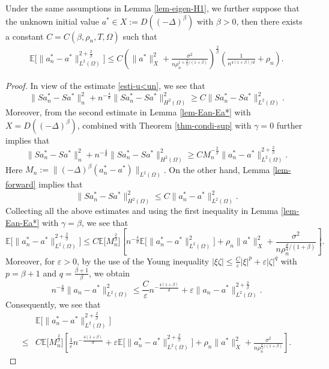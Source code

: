 \documentclass[10pt,a4paper]{amsart}
\begin{document}
\begin{theorem}\label{thm-E-condi}
Under the same assumptions in Lemma \ref{lem-eigen-H1}, we further suppose that the unknown initial value $a^*\in X:=D((-\Delta)^\beta)$ with $\beta>0$, then there exists a constant $C=C(\beta,\rho_n,T,\Omega)$ such that
\[
\begin{aligned}
\mathbb{E} \bigl[ \| a_n^* - a^* \|^{2+\frac{2}{\beta}}_{L^2(\Omega)} \bigr]
\le  C\left( \| a^* \|^2_{X} + \frac{\sigma^2}{n \rho_n^{1 + \frac{d}4/(1+\beta)}}\right)^{\frac2\beta} \left( \frac1{n^{4(1+\beta)/d}} +\rho_n \right).
\end{aligned}
\]
\end{theorem}

\begin{proof}
In view of the estimate \eqref{esti-u<un}, we see that
\[
 \| S a_n^* - S a^* \|^2_n  + n^{-\frac4d}  \| S a_n^* - S a^* \|^2_{H^2(\Omega)}  \geq C  \| S a_n^* - S a^* \|^2_{L^2(\Omega)}.
\]
Moreover, from the second estimate in Lemma \ref{lem-Ean-Ea*} with $X=D((-\Delta)^{\beta})$, combined with Theorem \ref{thm-condi-sup} with $\gamma=0$ further implies that
\[
 \| S a_n^* - S a^* \|^2_n  + n^{-\frac4d} \| S a_n^* - S a^* \|^2_{H^2(\Omega)}  \geq C  M_n^{-\frac{2}{\beta}}\| a_n^* - a^* \|^{2+\frac{2}{\beta}}_{L^2(\Omega)} .
\]
Here $M_n:= \|(-\Delta)^\beta (a_n^* - a^*)\|_{L^2(\Omega)}$. On the other hand, Lemma \ref{lem-forward} implies that
\[
 \| S a_n^* - S a^* \|^2_{H^2(\Omega)} \leq C \|a_n^* - a^* \|^2_{L^2(\Omega)} .
\]
Collecting all the above estimates and using the first inequality in Lemma \ref{lem-Ean-Ea*} with $\gamma=\beta$, we see that
\[
\mathbb{E} \bigl[ \| a_n^* - a^* \|^{2+\frac{2}{\beta}}_{L^2(\Omega)} \bigr]\le C\mathbb{E} \bigl[M_n^{\frac2\beta} \bigr] \left[n^{-\frac4d}\mathbb{E} \bigl[\|a_n^* - a^* \|^2_{L^2(\Omega)} \bigr] +  \rho_n \| a^* \|^2_{X} +  \frac{\sigma^2}{n \rho_n^{\frac{d}{4}/(1+\beta)}} \right].
\]
Moreover, for $\varepsilon>0$, by the use of the Young inequality $|\xi\zeta| \le \frac{C}{\varepsilon} |\xi|^p + \varepsilon |\zeta|^q$ with $p=\beta+1$ and $q=\frac{\beta+1}{\beta}$, we obtain
\[
 n^{-\frac4d}\|a_n - a^* \|^2_{L^2(\Omega)}  \le \frac{C}{\varepsilon}n^{-\frac{4(1+\beta)}d} + \varepsilon \|a_n - a^* \|^{2+\frac2\beta}_{L^2(\Omega)}.
\]
Consequently, we see that
\[
\begin{aligned}
&\mathbb{E} \bigl[ \| a_n^* - a^* \|^{2+\frac{2}{\beta}}_{L^2(\Omega)} \bigr] \\
\le&  C\mathbb{E} \bigl[M_n^{\frac2\beta} \bigr] \left[ \frac{1}{\varepsilon}n^{-\frac{4(1+\beta)}d}  + \varepsilon \mathbb{E} \bigl[\|a_n^* - a^* \|^{2+\frac2\beta}_{L^2(\Omega)} \bigr] +  \rho_n \| a^* \|^2_{X} +  \frac{\sigma^2}{n \rho_n^{\frac{d}{4}/(1+\beta)}} \right].

\end{aligned}\]
\end{proof}
\end{document}
